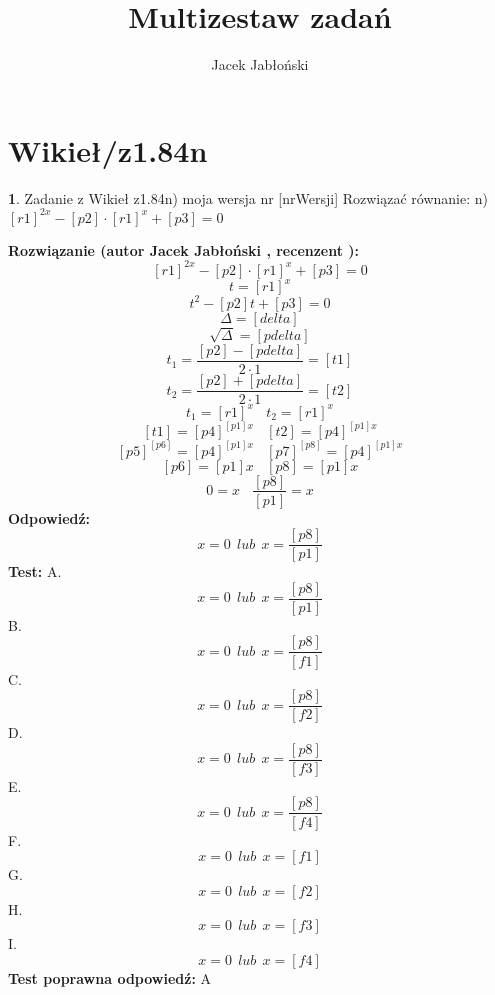 \documentclass[12pt, a4paper]{article}
\title{Multizestaw zadań}
\author{Jacek Jabłoński}
\date{}
\theoremstyle{definition} %
\newtheorem{zad}{}
\newcommand{\kategoria}[1]{\section{#1}} %
\newcommand{\zadStart}[1]{\begin{zad}#1\newline} %
\newcommand{\zadStop}{\end{zad}}   %
\newcommand{\rozwStart}[2]{\noindent \textbf{Rozwiązanie (autor #1 , recenzent #2): }\newline} %
\newcommand{\rozwStop}{\newline}                                            %
\newcommand{\odpStart}{\noindent \textbf{Odpowiedź:}\newline}    %
\newcommand{\odpStop}{\newline}                                             %
\newcommand{\testStart}{\noindent \textbf{Test:}\newline} %
\newcommand{\testStop}{\newline} %
\newcommand{\kluczStart}{\noindent \textbf{Test poprawna odpowiedź:}\newline} %
\newcommand{\kluczStop}{\newline} %
\begin{document}
\maketitle


\kategoria{Wikieł/z1.84n}
\zadStart{Zadanie z Wikieł z1.84n) moja wersja nr [nrWersji]}
Rozwiązać równanie:
n) $[r1]^{2x}-[p2] \cdot [r1]^{x} + [p3] = 0$
\zadStop
\rozwStart{Jacek Jabłoński}{}
$$[r1]^{2x}-[p2] \cdot [r1]^{x} + [p3] = 0$$
$$t = [r1]^x$$
$$t^2 -[p2]t + [p3] = 0 $$
$$\Delta = [delta]$$
$$\sqrt{\Delta} = [pdelta]$$
$$t_1 = \frac{[p2]-[pdelta]}{2 \cdot 1} = [t1]$$
$$t_2 = \frac{[p2]+[pdelta]}{2 \cdot 1} =[t2]$$
$$t_1 = [r1]^x \ \ \ \ t_2 = [r1]^x$$
$$[t1] = [p4]^{[p1]x} \ \ \ \ [t2] = [p4]^{[p1]x}$$
$$[p5]^{[p6]} = [p4]^{[p1]x} \ \ \ \ [p7]^{[p8]} = [p4]^{[p1]x}$$
$$[p6] = [p1]x \ \ \ \ [p8] = [p1]x$$
$$0 = x \ \ \ \ \frac{[p8]}{[p1]} = x$$
\rozwStop
\odpStart
$$ x = 0 \ \ lub \ \ x = \frac{[p8]}{[p1]} $$
\odpStop
\testStart
A. $$ x = 0 \ \ lub \ \ x = \frac{[p8]}{[p1]} $$
B. $$ x = 0 \ \ lub \ \ x = \frac{[p8]}{[f1]} $$
C. $$ x = 0 \ \ lub \ \ x = \frac{[p8]}{[f2]} $$
D. $$ x = 0 \ \ lub \ \ x = \frac{[p8]}{[f3]} $$
E. $$ x = 0 \ \ lub \ \ x = \frac{[p8]}{[f4]} $$
F. $$ x = 0 \ \ lub \ \ x = [f1] $$
G. $$ x = 0 \ \ lub \ \ x = [f2] $$
H. $$ x = 0 \ \ lub \ \ x = [f3] $$
I. $$ x = 0 \ \ lub \ \ x = [f4] $$
\testStop
\kluczStart
A
\kluczStop
\end{document}
